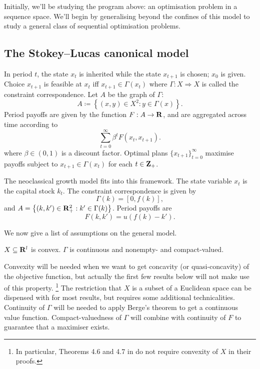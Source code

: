 \documentclass[11pt,letterpaper,reqno,oneside]{article}
\begin{document}
Initially, we'll be studying the program above: an optimisation problem in a sequence space. We'll begin by generalising beyond the confines of this model to study a general class of sequential optimisation problems.



\subsection{The Stokey--Lucas canonical model}
\label{sec:21Sep2015:Stokey--Lucas_canonical_model}

In period $t$, the state $x_t$ is inherited while the state $x_{t+1}$ is chosen; $x_0$ is given. Choice $x_{t+1}$ is feasible at $x_t$ iff $x_{t+1} \in \Gamma(x_t)$ where $\Gamma : X \Rightarrow X$ is called the constraint correspondence. Let $A$ be the graph of $\Gamma$:
%
\begin{equation*}
	A \coloneqq \left\{ (x,y) \in X^2 : y \in \Gamma(x) \right\} .
\end{equation*}
%
Period payoffs are given by the function $F : A \to \mathbf{R}$, and are aggregated across time
according to 
%
\begin{equation*}
	\sum_{t=0}^\infty \beta^t F \left( x_t, x_{t+1} \right) .
\end{equation*}
%
where $\beta \in (0,1)$ is a discount factor. Optimal plans $\{ x_{t+1} \}_{t=0}^\infty$ maximise payoffs subject to $x_{t+1} \in \Gamma(x_t)$ for each $t \in \mathbf{Z}_+$.

The neoclassical growth model fits into this framework. The state variable $x_t$ is the capital stock $k_t$. The constraint correspondence is given by
%
\begin{equation*}
	\Gamma(k) 
	= \left[ 0 , f(k) \right] ,
\end{equation*}
%
and $A = \left\{ (k,k') \in \mathbf{R}_+^2 : k' \in \Gamma(k) \right\}$. Period payoffs are
%
\begin{equation*}
	F(k,k') = u \left( f(k) - k' \right) .
\end{equation*}

We now give a list of assumptions on the general model.
%
\begin{assumption}
	\label{assumption:4.3}
	$X \subseteq \mathbf{R}^l$ is convex. $\Gamma$ is continuous and nonempty- and compact-valued.
\end{assumption}

Convexity will be needed when we want to get concavity (or quasi-concavity) of the objective function, but actually the first few results below will not make use of this property.%
	\footnote{In particular, Theorems 4.6 and 4.7 in \textcite{StokeyLucasPrescott1989} do not require convexity of $X$ in their proofs.}
The restriction that $X$ is a subset of a Euclidean space can be dispensed with for most results, but requires some additional technicalities. Continuity of $\Gamma$ will be needed to apply Berge's theorem to get a continuous value function. Compact-valuedness of $\Gamma$ will combine with continuity of $F$ to guarantee that a maximiser exists.
\end{document}
